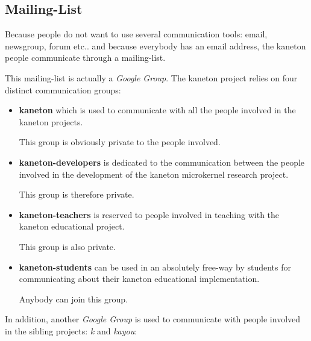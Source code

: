 %
%
%
%
%
%

%
%

\subsection{Mailing-List}
\label{section:mailing-list}

Because people do not want to use several communication tools: email,
newsgroup, forum etc.. and because everybody has an email address, the
kaneton people communicate through a mailing-list.

This mailing-list is actually a \textit{Google Group}. The kaneton
project relies on four distinct communication groups:

\begin{itemize}
  \item
    \textbf{kaneton} which is used to communicate with all the people involved
    in the kaneton projects.

    \-

    This group is obviously private to the people involved.
  \item
    \textbf{kaneton-developers} is dedicated to the communication between the
    people involved in the development of the kaneton microkernel research
    project.

    \-

    This group is therefore private.
  \item
    \textbf{kaneton-teachers} is reserved to people involved in teaching
    with the kaneton educational project.

    \-

    This group is also private.
  \item
    \textbf{kaneton-students} can be used in an absolutely free-way by
    students for communicating about their kaneton educational implementation.

    \-

    Anybody can join this group.
\end{itemize}

In addition, another \textit{Google Group} is used to communicate with people
involved in the sibling projects: \textit{k} and \textit{kayou}:

